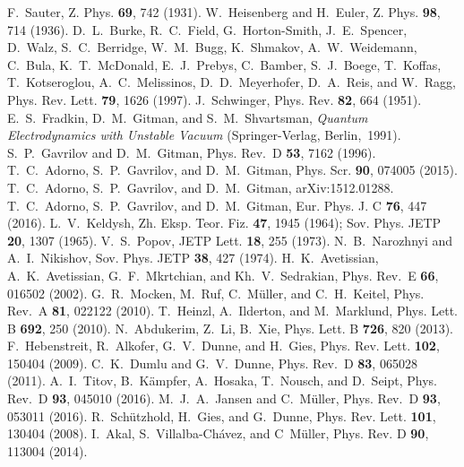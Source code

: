 \documentclass[preprint,aps,prd,showpacs,floatfix]{revtex4-1}
\begin{document}
\begin{thebibliography}{99}
%
 F.~Sauter, Z. Phys. {\bf 69}, 742 (1931).
%
 W.~Heisenberg and H.~Euler, Z. Phys. {\bf 98}, 714 (1936).
%
 D.~L.~Burke, R.~C.~Field, G.~Horton-Smith, J.~E.~Spencer, D.~Walz, S.~C.~Berridge, W.~M.~Bugg, K.~Shmakov, A.~W.~Weidemann, C.~Bula, K.~T.~McDonald, E.~J.~Prebys, C.~Bamber, S.~J.~Boege, T.~Koffas, T.~Kotseroglou, A.~C.~Melissinos, D.~D.~Meyerhofer, D.~A.~Reis, and W.~Ragg, Phys. Rev. Lett. {\bf 79}, 1626 (1997).
%
 J.~Schwinger, Phys. Rev. {\bf 82}, 664 (1951).
%
 E.~S.~Fradkin, D.~M.~Gitman, and S.~M.~Shvartsman, {\it Quantum Electrodynamics with Unstable Vacuum} (Springer-Verlag, Berlin,~1991).
%
 S.~P.~Gavrilov and D.~M.~Gitman, Phys. Rev.~D {\bf 53}, 7162 (1996).
%
  T.~C.~Adorno, S.~P.~Gavrilov, and D.~M.~Gitman, Phys. Scr. {\bf 90}, 074005 (2015).
%
 T.~C.~Adorno, S.~P.~Gavrilov, and D.~M.~Gitman, arXiv:1512.01288.
%
 T.~C.~Adorno, S.~P.~Gavrilov, and D.~M.~Gitman, Eur. Phys. J. C {\bf 76}, 447 (2016).
%
 L.~V.~Keldysh, Zh. Eksp. Teor. Fiz. {\bf 47}, 1945 (1964); Sov. Phys. JETP {\bf 20}, 1307 (1965).
%
 V.~S.~Popov, JETP Lett. {\bf 18}, 255 (1973).
%
 N.~B.~Narozhnyi and A.~I.~Nikishov, Sov. Phys. JETP {\bf 38}, 427 (1974).
%
 H.~K.~Avetissian, A.~K.~Avetissian, G.~F.~Mkrtchian, and Kh.~V.~Sedrakian, Phys. Rev.~E {\bf 66}, 016502 (2002).
%
 G.~R.~Mocken, M.~Ruf,  C.~M\"uller, and C.~H.~Keitel, Phys. Rev.~A {\bf 81}, 022122 (2010).
%
 T.~Heinzl, A.~Ilderton, and M.~Marklund, Phys. Lett. B {\bf 692}, 250 (2010).
%
 N.~Abdukerim, Z.~Li, B.~Xie, Phys. Lett. B {\bf 726}, 820 (2013).
%
 F.~Hebenstreit, R.~Alkofer, G.~V.~Dunne, and H.~Gies, Phys. Rev. Lett. {\bf 102}, 150404 (2009).
%
 C.~K.~Dumlu and G.~V.~Dunne, Phys. Rev.~D {\bf 83}, 065028 (2011).
%
 A.~I.~Titov, B.~K\"ampfer, A.~Hosaka, T.~Nousch, and D.~Seipt, Phys. Rev.~D {\bf 93}, 045010 (2016).
%
 M.~J.~A.~Jansen and C.~M\"uller, Phys. Rev.~D {\bf 93}, 053011 (2016).
%
 R.~Sch\"utzhold, H.~Gies, and G.~Dunne, Phys. Rev. Lett. {\bf 101}, 130404 (2008).
%
 I.~Akal, S.~Villalba-Ch\'avez, and C~M\"uller, Phys. Rev. D {\bf 90}, 113004 (2014).

\end{thebibliography}
\end{document}
